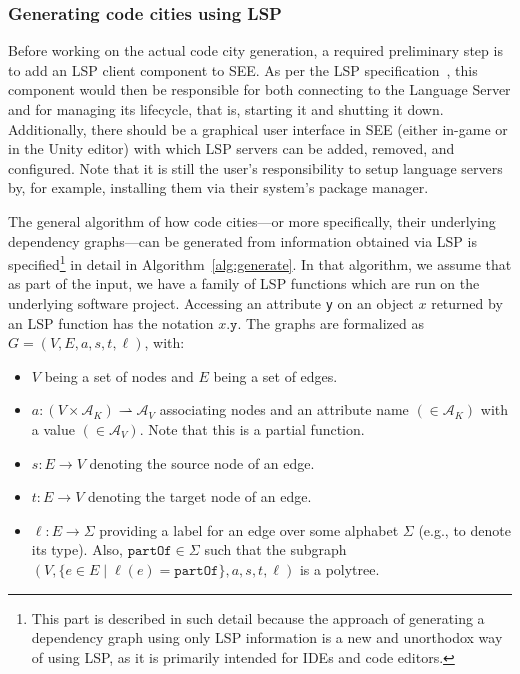 \documentclass{scrartcl}
\newcommand{\SEE}{\textsc{SEE}}
\begin{document}
{\subsubsection{Generating code cities using LSP}\label{subsubsec:generate}
Before working on the actual code city generation, a required preliminary step is to add an LSP client component to \SEE{}.
As per the LSP specification~\cite{lsp}, this component would then be responsible for both connecting to the Language Server and for managing its lifecycle, that is, starting it and shutting it down.
Additionally, there should be a graphical user interface in \SEE{} (either in-game or in the Unity editor) with which LSP servers can be added, removed, and configured.
Note that it is still the user's responsibility to setup language servers by, for example, installing them via their system's package manager.

The general algorithm of how code cities---or more specifically, their underlying dependency graphs---can be generated from information obtained via LSP is specified\footnote{
  This part is described in such detail because the approach of generating a dependency graph using only LSP information is a new and unorthodox way of using LSP, as it is primarily intended for IDEs and code editors.
} in detail in Algorithm~\ref{alg:generate}.
In that algorithm, we assume that as part of the input, we have a family of LSP functions which are run on the underlying software project.
Accessing an attribute \texttt{y} on an object $x$ returned by an LSP function has the notation $x\texttt{.y}$.
The graphs are formalized as $G = (V, E, a, s, t, \ell)$, with:
\begin{itemize}
  \item $V$ being a set of nodes and $E$ being a set of edges.
  \item $a: (V \times \mathcal{A}_K) \rightharpoonup \mathcal{A}_V$ associating nodes and an attribute name $(\in \mathcal{A}_{K})$ with a value $(\in \mathcal{A}_{V})$. Note that this is a partial function.
  \item $s: E \rightarrow V$ denoting the source node of an edge.
  \item $t: E \rightarrow V$ denoting the target node of an edge.
  \item $\ell: E \rightarrow \Sigma$ providing a label for an edge over some alphabet $\Sigma$ (e.g., to denote its type).
    Also, $\texttt{partOf} \in \Sigma$ such that the subgraph $(V, \{e \in E \mid \ell(e) = \texttt{partOf}\}, a, s, t, \ell)$ is a polytree.
\end{itemize}

}
\end{document}
